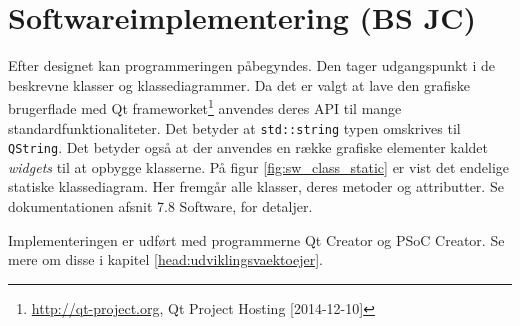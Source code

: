 \section{Softwareimplementering (BS JC)}\label{head:sw_impl}
Efter designet kan programmeringen påbegyndes. Den tager udgangspunkt i de beskrevne klasser og klassediagrammer.
Da det er valgt at lave den grafiske brugerflade med Qt frameworket\footnote{\url{http://qt-project.org}, Qt Project Hosting [2014-12-10]} anvendes deres API til mange standardfunktionaliteter. Det betyder at \verb+std::string+ typen omskrives til \verb+QString+. 
Det betyder også at der anvendes en række grafiske elementer kaldet \textit{widgets} til at opbygge klasserne. På figur \ref{fig:sw_class_static} er vist det endelige statiske klassediagram. Her fremgår alle klasser, deres metoder og attributter.
Se dokumentationen afsnit 7.8 Software, for detaljer.


Implementeringen er udført med programmerne Qt Creator og PSoC Creator. Se mere om disse i kapitel \ref{head:udviklingsvaektoejer}.

